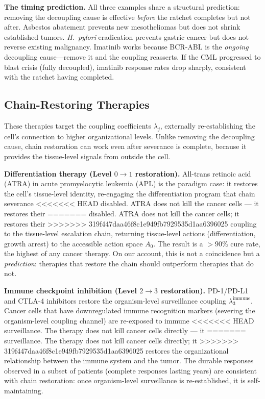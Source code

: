 \documentclass[11pt]{article}
\theoremstyle{definition}
\theoremstyle{remark}
\begin{document}
\textbf{The timing prediction.} All three examples share a
structural prediction: removing the decoupling cause is effective
\emph{before} the ratchet completes but not after. Asbestos
abatement prevents new mesotheliomas but does not shrink established
tumors. \emph{H.~pylori} eradication prevents gastric cancer but
does not reverse existing malignancy. Imatinib works because
BCR-ABL is the \emph{ongoing} decoupling cause---remove it and the
coupling reasserts. If the CML progressed to blast crisis (fully
decoupled), imatinib response rates drop sharply, consistent with
the ratchet having completed.

\subsection{Chain-Restoring Therapies}

These therapies target the coupling coefficients $\lambda_j$,
externally re-establishing the cell's connection to higher
organizational levels. Unlike removing the decoupling cause, chain
restoration can work even after severance is complete, because it
provides the tissue-level signals from outside the cell.

\textbf{Differentiation therapy (Level $0 \to 1$ restoration).}
All-trans retinoic acid (ATRA) in acute promyelocytic leukemia (APL)
is the paradigm case: it restores the cell's tissue-level identity,
re-engaging the differentiation program that chain severance
<<<<<<< HEAD
disabled. ATRA does not kill the cancer cells --- it restores their
=======
disabled. ATRA does not kill the cancer cells; it restores their
>>>>>>> 319f447daa46f8c1e949fb7929535d1aa6396025
coupling to the tissue-level escalation chain, returning tissue-level
actions (differentiation, growth arrest) to the accessible action
space $A_0$. The result is a $>90\%$ cure rate, the highest of any
cancer therapy. On our account, this is not a coincidence but a
\emph{prediction}: therapies that restore the chain should
outperform therapies that do not.

\textbf{Immune checkpoint inhibition (Level $2 \to 3$ restoration).}
PD-1/PD-L1 and CTLA-4 inhibitors restore the organism-level
surveillance coupling $\lambda_3^{\mathrm{immune}}$. Cancer cells
that have downregulated immune recognition markers (severing the
organism-level coupling channel) are re-exposed to immune
<<<<<<< HEAD
surveillance. The therapy does not kill cancer cells directly --- it
=======
surveillance. The therapy does not kill cancer cells directly; it
>>>>>>> 319f447daa46f8c1e949fb7929535d1aa6396025
restores the organizational relationship between the immune system
and the tumor. The durable responses observed in a subset of patients
(complete responses lasting years) are consistent with chain
restoration: once organism-level surveillance is re-established, it
is self-maintaining.
\end{document}
